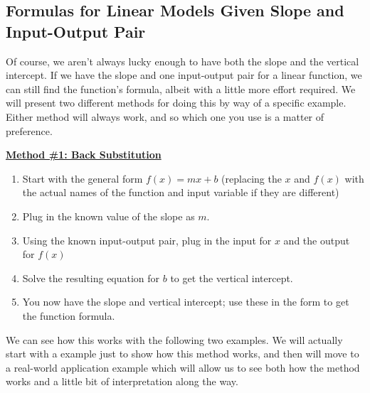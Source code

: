 \subsection{Formulas for Linear Models Given Slope and Input-Output Pair}

Of course, we aren’t always lucky enough to have both the slope and the vertical intercept. If we have the slope and one input-output pair for a linear function, we can still find the function’s formula, albeit with a little more effort required. We will present two different methods for doing this by way of a specific example. Either method will always work, and so which one you use is a matter of preference.\\

\begin{definition}
	\textbf{\underline{Method \#1: Back Substitution}}\\
	\vspace{12 pt}
	\begin{enumerate}
		\item Start with the general form $f(x)=mx+b$ (replacing the $x$ and $f(x)$ with the actual names of the function and input variable if they are different)
		\item Plug in the known value of the slope as $m$.
		\item Using the known input-output pair, plug in the input for $x$ and the output for $f(x)$
		\item Solve the resulting equation for $b$ to get the vertical intercept.
		\item You now have the slope and vertical intercept; use these in the  form to get the function formula.
	\end{enumerate}
\end{definition}

We can see how this works with the following two examples. We will actually start with a  example just to show how this method works, and then will move to a real-world application example which will allow us to see both how the method works and a little bit of interpretation along the way.


